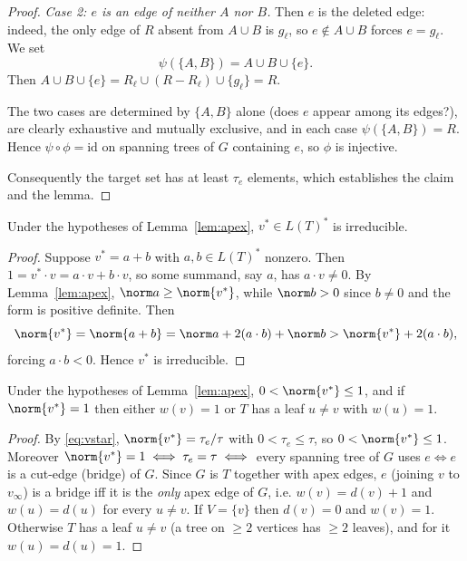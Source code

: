 \begin{proof}
\emph{Case 2: $e$ is an edge of neither $A$ nor $B$.}  Then $e$ is the deleted edge: indeed,
the only edge of $R$ absent from $A\cup B$ is $g_\ell$, so $e\notin A\cup B$ forces $e=g_\ell$.
We set
\[
\psi(\{A,B\})=A\cup B\cup\{e\}.
\]
Then $A\cup B\cup\{e\}=R_\ell\cup(R-R_\ell)\cup\{g_\ell\}=R$.

The two cases are determined by $\{A,B\}$ alone (does $e$ appear among its edges?), are
clearly exhaustive and mutually exclusive, and in each case $\psi(\{A,B\})=R$.  Hence
$\psi\circ\phi=\mathrm{id}$ on spanning trees of $G$ containing $e$, so $\phi$ is injective.

\smallskip
Consequently the target set has at least $\tau_e$ elements, which establishes the claim and
the lemma.
\end{proof}

\begin{cor}
\label{cor:apex}
Under the hypotheses of Lemma~\ref{lem:apex}, $v^\ast\in L(T)^\ast$ is irreducible.
\end{cor}

\begin{proof}
Suppose $v^\ast=a+b$ with $a,b\in L(T)^\ast$ nonzero.  Then
$1=v^\ast\cdot v=a\cdot v+b\cdot v$, so some summand, say $a$, has $a\cdot v\ne0$.  By
Lemma~\ref{lem:apex}, $\norm a\ge\norm{v^\ast}$, while $\norm b>0$ since $b\ne0$ and the form
is positive definite.  Then
\[
\norm{v^\ast}=\norm{a+b}=\norm a+2(a\cdot b)+\norm b>\norm{v^\ast}+2(a\cdot b),
\]
forcing $a\cdot b<0$.  Hence $v^\ast$ is irreducible.
\end{proof}

\begin{cor}
\label{cor:tight}
Under the hypotheses of Lemma~\ref{lem:apex}, $0<\norm{v^\ast}\le1$, and if $\norm{v^\ast}=1$
then either $w(v)=1$ or $T$ has a leaf $u\ne v$ with $w(u)=1$.
\end{cor}

\begin{proof}
By \eqref{eq:vstar}, $\norm{v^\ast}=\tau_e/\tau$ with $0<\tau_e\le\tau$, so
$0<\norm{v^\ast}\le1$.  Moreover $\norm{v^\ast}=1\iff\tau_e=\tau\iff$ every spanning tree of
$G$ uses $e\iff e$ is a cut-edge (bridge) of $G$.  Since $G$ is $T$ together with apex edges,
$e$ (joining $v$ to $v_\infty$) is a bridge iff it is the \emph{only} apex edge of $G$, i.e.
$w(v)=d(v)+1$ and $w(u)=d(u)$ for every $u\ne v$.  If $V=\{v\}$ then $d(v)=0$ and
$w(v)=1$.  Otherwise $T$ has a leaf $u\ne v$ (a tree on $\ge2$ vertices has $\ge2$ leaves),
and for it $w(u)=d(u)=1$.
\end{proof}

